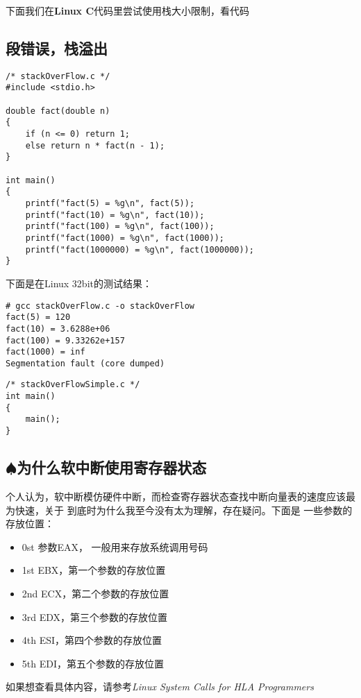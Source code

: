 \documentclass{article}
\begin{document}
下面我们在\textbf{Linux C}代码里尝试使用栈大小限制，看代码

\subsection{段错误，栈溢出}
\begin{verbatim}
/* stackOverFlow.c */
#include <stdio.h>

double fact(double n) 
{
	if (n <= 0) return 1;
	else return n * fact(n - 1);
}

int main() 
{
	printf("fact(5) = %g\n", fact(5));
	printf("fact(10) = %g\n", fact(10));
	printf("fact(100) = %g\n", fact(100));
	printf("fact(1000) = %g\n", fact(1000));
	printf("fact(1000000) = %g\n", fact(1000000));
}
\end{verbatim}

下面是在Linux 32bit的测试结果：

\begin{verbatim}
# gcc stackOverFlow.c -o stackOverFlow
fact(5) = 120
fact(10) = 3.6288e+06
fact(100) = 9.33262e+157
fact(1000) = inf
Segmentation fault (core dumped)

\end{verbatim}

\begin{verbatim}
/* stackOverFlowSimple.c */
int main()
{
	main();
}
\end{verbatim}

\subsection{$\spadesuit$为什么软中断使用寄存器状态}
个人认为，软中断模仿硬件中断，而检查寄存器状态查找中断向量表的速度应该最为快速，关于
到底时为什么我至今没有太为理解，存在疑问。下面是
一些参数的存放位置：
\begin{itemize}
\item 0st 参数EAX， 一般用来存放系统调用号码
\item 1st EBX，第一个参数的存放位置
\item 2nd ECX，第二个参数的存放位置
\item 3rd EDX，第三个参数的存放位置
\item 4th ESI，第四个参数的存放位置
\item 5th EDI，第五个参数的存放位置
\end{itemize}
如果想查看具体内容，请参考\textit{Linux System Calls for HLA Programmers}
\end{document}
